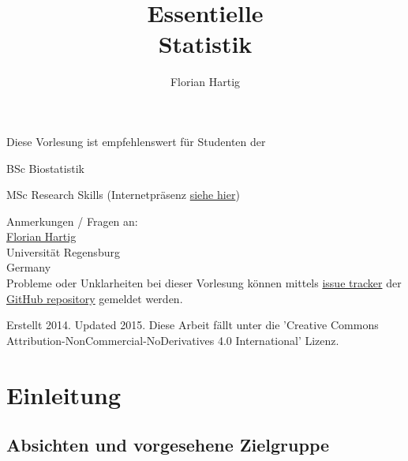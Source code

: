 \documentclass[a4paper,twoside]{tufte-book}\usepackage[]{graphicx}\usepackage[]{color}
\title{Essentielle\\Statistik}
\author{Florian Hartig}
\begin{document}
	
	\let\cleardoublepage\clearpage %
	\maketitle
	
	
	\thispagestyle{empty}
	\null
	
	\begin{fullwidth}
		Diese Vorlesung ist empfehlenswert für Studenten der
		
		\begin{itemize*}
			\item BSc Biostatistik
			\item MSc Research Skills (Internetpräsenz \href{http://florianhartig.github.io/ResearchSkills/}{siehe hier})
		\end{itemize*}
		
		\vspace{0.5cm}
		
		Anmerkungen / Fragen an:\\[0.5cm]
		\href{https://florianhartig.wordpress.com/}{Florian Hartig}\\
		Universität Regensburg\\
		Germany\\[0.5cm]
		
		Probleme oder Unklarheiten bei dieser Vorlesung können mittels \href{https://github.com/florianhartig/Statistics/issues}{issue tracker} der \href{https://github.com/florianhartig/Statistics/tree/master/EssentialStatistics}{GitHub repository} gemeldet werden. 
		
	\end{fullwidth}
	
	
	\vfill
	\begin{fullwidth}
		Erstellt 2014. Updated 2015. Diese Arbeit fällt unter die 'Creative Commons Attribution-NonCommercial-NoDerivatives 4.0 International' Lizenz.
	\end{fullwidth}
	
	\newpage
	\renewcommand{\contentsname}{Inhalt}
	\tableofcontents
	
	\newpage
	
	\chapter{Einleitung} %
	
	\section{Absichten und vorgesehene Zielgruppe}
	
\end{document}
